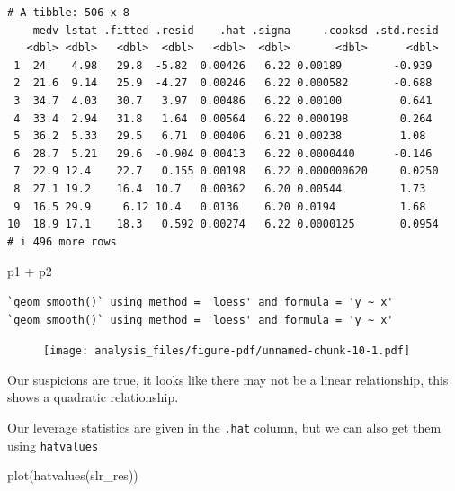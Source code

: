 \documentclass[
  letterpaper,
  DIV=11,
  numbers=noendperiod]{scrreprt}
\newenvironment{Shaded}{\begin{snugshade}}{\end{snugshade}}
\newcommand{\FunctionTok}[1]{\textcolor[rgb]{0.02,0.16,0.49}{#1}}
\newcommand{\NormalTok}[1]{\textcolor[rgb]{0.33,0.33,0.33}{#1}}
\newcommand{\SpecialCharTok}[1]{\textcolor[rgb]{0.00,0.46,0.62}{#1}}
\begin{document}
\begin{verbatim}
# A tibble: 506 x 8
    medv lstat .fitted .resid    .hat .sigma     .cooksd .std.resid
   <dbl> <dbl>   <dbl>  <dbl>   <dbl>  <dbl>       <dbl>      <dbl>
 1  24    4.98   29.8  -5.82  0.00426   6.22 0.00189        -0.939 
 2  21.6  9.14   25.9  -4.27  0.00246   6.22 0.000582       -0.688 
 3  34.7  4.03   30.7   3.97  0.00486   6.22 0.00100         0.641 
 4  33.4  2.94   31.8   1.64  0.00564   6.22 0.000198        0.264 
 5  36.2  5.33   29.5   6.71  0.00406   6.21 0.00238         1.08  
 6  28.7  5.21   29.6  -0.904 0.00413   6.22 0.0000440      -0.146 
 7  22.9 12.4    22.7   0.155 0.00198   6.22 0.000000620     0.0250
 8  27.1 19.2    16.4  10.7   0.00362   6.20 0.00544         1.73  
 9  16.5 29.9     6.12 10.4   0.0136    6.20 0.0194          1.68  
10  18.9 17.1    18.3   0.592 0.00274   6.22 0.0000125       0.0954
# i 496 more rows
\end{verbatim}

\begin{Shaded}
\begin{Highlighting}[]
\NormalTok{p1 }\SpecialCharTok{+}\NormalTok{ p2}
\end{Highlighting}
\end{Shaded}

\begin{verbatim}
`geom_smooth()` using method = 'loess' and formula = 'y ~ x'
`geom_smooth()` using method = 'loess' and formula = 'y ~ x'
\end{verbatim}

\begin{figure}[H]

{\centering \texttt{[image: analysis\_files/figure-pdf/unnamed-chunk-10-1.pdf]}

}

\end{figure}

Our suspicions are true, it looks like there may not be a linear
relationship, this shows a quadratic relationship.

Our leverage statistics are given in the \texttt{.hat} column, but we
can also get them using \texttt{hatvalues}

\begin{Shaded}
\begin{Highlighting}[]
\FunctionTok{plot}\NormalTok{(}\FunctionTok{hatvalues}\NormalTok{(slr\_res))}
\end{Highlighting}
\end{Shaded}
\end{document}
